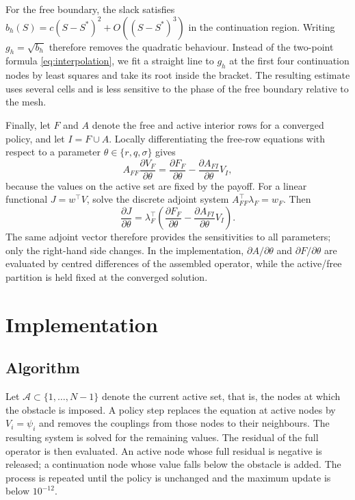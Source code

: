 \documentclass[11pt,a4paper]{article}
\theoremstyle{definition}
\theoremstyle{remark}
\begin{document}
For the free boundary, the slack satisfies
$b_h(S)=c(S-S^*)^2+O((S-S^*)^3)$ in the continuation region. Writing
$g_h=\sqrt{b_h}$ therefore removes the quadratic behaviour. Instead of the
two-point formula \eqref{eq:interpolation}, we fit a straight line to $g_h$
at the first four continuation nodes by least squares and take its root
inside the bracket. The resulting estimate uses several cells and is less
sensitive to the phase of the free boundary relative to the mesh.

Finally, let $F$ and $A$ denote the free and active interior rows for a
converged policy, and let $I=F\cup A$. Locally differentiating the free-row
equations with respect to a parameter $\theta\in\{r,q,\sigma\}$ gives
\begin{equation}
    A_{FF}\frac{\partial V_F}{\partial\theta}
    =\frac{\partial F_F}{\partial\theta}
    -\frac{\partial A_{FI}}{\partial\theta}V_I,
    \label{eq:adjoint-system}
\end{equation}
because the values on the active set are fixed by the payoff. For a linear
functional $J=w^\top V$, solve the discrete adjoint system
$A_{FF}^\top\lambda_F=w_F$. Then
\begin{equation}
    \frac{\partial J}{\partial\theta}
    =\lambda_F^\top\left(
    \frac{\partial F_F}{\partial\theta}
    -\frac{\partial A_{FI}}{\partial\theta}V_I
    \right).
    \label{eq:adjoint-derivative}
\end{equation}
The same adjoint vector therefore provides the sensitivities to all
parameters; only the right-hand side changes. In the implementation,
$\partial A/\partial\theta$ and $\partial F/\partial\theta$ are evaluated by
centred differences of the assembled operator, while the active/free
partition is held fixed at the converged solution.

\newpage
\section{Implementation}
\label{sec:implementation}

\subsection{Algorithm}
\label{sec:algorithm}
Let $\mathcal{A}\subset\{1,\ldots,N-1\}$ denote the current active set, that
is, the nodes at which the obstacle is imposed. A policy step replaces the
equation at active nodes by $V_i=\psi_i$ and removes the couplings from those
nodes to their neighbours. The resulting system is solved for the remaining
values. The residual of the full operator is then evaluated. An active node
whose full residual is negative is released; a continuation node whose value
falls below the obstacle is added. The process is repeated until the policy
is unchanged and the maximum update is below $10^{-12}$.
\end{document}
